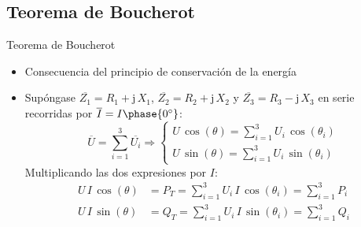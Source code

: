 \documentclass[aspectratio=169, xcolor={usenames,svgnames,dvipsnames}]{beamer}
\begin{document}
\subsection{Teorema de Boucherot}

\begin{frame}{Teorema de Boucherot}
\begin{itemize}
\item Consecuencia del \alert{principio de conservación de la energía}
\item Supóngase $\overline{Z_1}=R_1+\mathrm{j}\,X_1$, $\overline{Z_2}=R_2+\mathrm{j}\,X_2$ y $\overline{Z_3}=R_3-\mathrm{j}\,X_3$ en serie recorridas por $\overline{I}=I\phase{0^\circ}$:
	\begin{equation*}
		\overline{U}=\sum_{i=1}^3 \overline{U_i}\Rightarrow
		\begin{cases}
			U\,\cos(\theta)=\displaystyle\sum_{i=1}^3 U_i\,\cos(\theta_i)\\
			U\,\sin(\theta)=\displaystyle\sum_{i=1}^3 U_i\,\sin(\theta_i)
		\end{cases}
	\end{equation*}
	Multiplicando las dos expresiones por ${I}$: 
	\begin{align*}
		U\,I\,\cos(\theta)&=P_T=\displaystyle\sum_{i=1}^3 U_i\,I\,\cos(\theta_i)=\displaystyle\sum_{i=1}^3 P_i\\
		U\,I\,\sin(\theta)&=Q_T=\displaystyle\sum_{i=1}^3 U_i\,I\,\sin(\theta_i)=\displaystyle\sum_{i=1}^3 Q_i
	\end{align*}
\end{itemize}
\end{frame}
\end{document}
